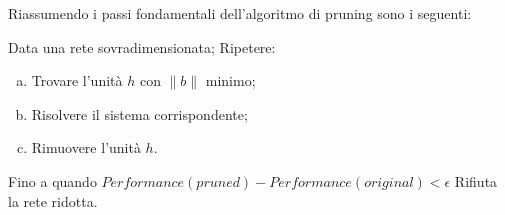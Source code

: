 Riassumendo i passi fondamentali dell'algoritmo di pruning sono i seguenti:
\begin{algorithmic}[1]%
    \State Data una rete sovradimensionata;
    \State Ripetere:
	\begin{enumerate}[(a)]
		\item Trovare l'unità $h$ con $\| b \|$ minimo;
		\item Risolvere il sistema corrispondente;
		\item Rimuovere l'unità $h$.
	\end{enumerate}
	Fino a quando $Performance(pruned) - Performance(original) < \epsilon$
	\State Rifiuta la rete ridotta.
\end{algorithmic}




















